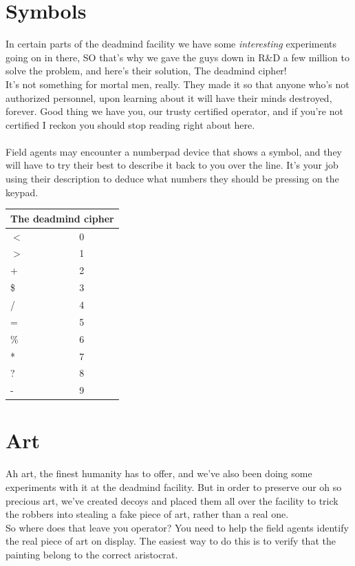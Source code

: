 \documentclass{article}
\begin{document}
\section* {Symbols}
In certain parts of the deadmind facility we have some \textit{interesting} experiments going on in there, SO that's why we gave the guys down in R\&D a few million to solve the problem, and here's their solution, The deadmind cipher!\\ It's not something for mortal men, really. They made it so that anyone who's not authorized personnel, upon learning about it will have their minds destroyed, forever. Good thing we have you, our trusty certified operator, and if you're not certified I reckon you should stop reading right about here.\\\\
Field agents may encounter a numberpad device that shows a symbol, and they will have to try their best to describe it back to you over the line. It's your job using their description to deduce what numbers they should be pressing on the keypad.
\begin{center}
\begin{tabular}{ |p{2cm}||p{3.5cm}| }
 \hline
 \multicolumn{2}{|c|}{The deadmind cipher} \\
 \hline
 $<$& 0\\
 \hline
 $>$& 1\\
 \hline
 $+$   & 2\\
 \hline
 \$   & 3\\
 \hline
 /   & 4\\
 \hline
 =   & 5\\
 \hline
 \%   & 6\\
 \hline
 *   & 7\\
 \hline
 ?   & 8\\
 \hline
 -   & 9\\
 \hline
\end{tabular}
\end{center}

\newpage
\BgThispage
\thispagestyle{empty}
\section*{Art}
Ah art, the finest humanity has to offer, and we've also been doing some experiments with it at the deadmind facility. But in order to preserve our oh so precious art, we've created decoys and placed them all over the facility to trick the robbers into stealing a fake piece of art, rather than a real one.\\
So where does that leave you operator? You need to help the field agents identify the real piece of art on display. The easiest way to do this is to verify that the painting belong to the correct aristocrat.\\
\end{document}
